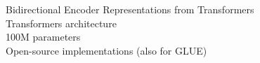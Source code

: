 \documentclass[preview]{standalone}
\begin{document}
Bidirectional Encoder Representations from Transformers\\Transformers architecture\\100M parameters\\Open-source implementations (also for GLUE)\\
\end{document}
